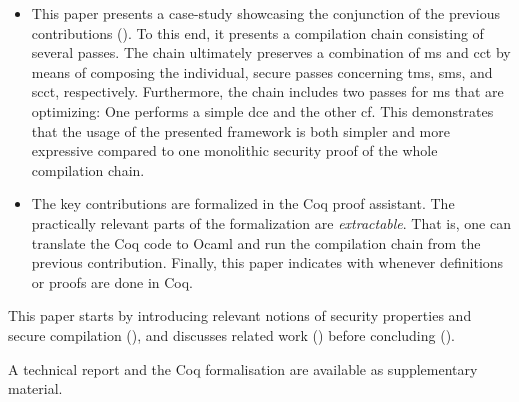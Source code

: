\documentclass[acmsmall,review,screen,dvipsnames]{acmart}
\begin{document}
\begin{itemize}
  \item %
        This paper presents a case-study showcasing the conjunction of the previous contributions ().
        To this end, it presents a compilation chain consisting of several passes.
        The chain ultimately preserves a combination of \gls{ms} and \gls{cct} by means of composing the individual, secure passes concerning \gls{tms}, \gls{sms}, and \gls{scct}, respectively.
        Furthermore, the chain includes two passes for \gls{ms} that are optimizing: One performs a simple \gls{dce} and the other \gls{cf}.
        This demonstrates that the usage of the presented framework is both simpler and more expressive compared to one monolithic security proof of the whole compilation chain.

  \item The key contributions are formalized in the Coq proof assistant.
        The practically relevant parts of the formalization are \emph{extractable}.
        That is, one can translate the Coq code to Ocaml and run the compilation chain from the previous contribution.
        Finally, this paper indicates with \CoqSymbol whenever definitions or proofs are done in Coq.
\end{itemize}

This paper starts by introducing relevant notions of security properties and secure compilation (),
and discusses related work () before concluding ().

 A technical report and the Coq formalisation are available as supplementary material.
\end{document}
